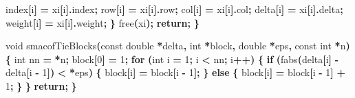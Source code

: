 \documentclass[
  12pt,
]{article}
\newenvironment{Shaded}{\begin{snugshade}}{\end{snugshade}}
\newcommand{\ControlFlowTok}[1]{\textcolor[rgb]{0.13,0.29,0.53}{\textbf{#1}}}
\newcommand{\DataTypeTok}[1]{\textcolor[rgb]{0.13,0.29,0.53}{#1}}
\newcommand{\DecValTok}[1]{\textcolor[rgb]{0.00,0.00,0.81}{#1}}
\newcommand{\NormalTok}[1]{#1}
\newcommand{\OperatorTok}[1]{\textcolor[rgb]{0.81,0.36,0.00}{\textbf{#1}}}
\begin{document}
\begin{Shaded}
\begin{Highlighting}[]
\NormalTok{        index}\OperatorTok{[}\NormalTok{i}\OperatorTok{]} \OperatorTok{=}\NormalTok{ xi}\OperatorTok{[}\NormalTok{i}\OperatorTok{].}\NormalTok{index}\OperatorTok{;}
\NormalTok{        row}\OperatorTok{[}\NormalTok{i}\OperatorTok{]} \OperatorTok{=}\NormalTok{ xi}\OperatorTok{[}\NormalTok{i}\OperatorTok{].}\NormalTok{row}\OperatorTok{;}
\NormalTok{        col}\OperatorTok{[}\NormalTok{i}\OperatorTok{]} \OperatorTok{=}\NormalTok{ xi}\OperatorTok{[}\NormalTok{i}\OperatorTok{].}\NormalTok{col}\OperatorTok{;}
\NormalTok{        delta}\OperatorTok{[}\NormalTok{i}\OperatorTok{]} \OperatorTok{=}\NormalTok{ xi}\OperatorTok{[}\NormalTok{i}\OperatorTok{].}\NormalTok{delta}\OperatorTok{;}
\NormalTok{        weight}\OperatorTok{[}\NormalTok{i}\OperatorTok{]} \OperatorTok{=}\NormalTok{ xi}\OperatorTok{[}\NormalTok{i}\OperatorTok{].}\NormalTok{weight}\OperatorTok{;}
    \OperatorTok{\}}
\NormalTok{    free}\OperatorTok{(}\NormalTok{xi}\OperatorTok{);}
    \ControlFlowTok{return}\OperatorTok{;}
\OperatorTok{\}}

\DataTypeTok{void}\NormalTok{ smacofTieBlocks}\OperatorTok{(}\DataTypeTok{const} \DataTypeTok{double} \OperatorTok{*}\NormalTok{delta}\OperatorTok{,} \DataTypeTok{int} \OperatorTok{*}\NormalTok{block}\OperatorTok{,} \DataTypeTok{double} \OperatorTok{*}\NormalTok{eps}\OperatorTok{,}
                     \DataTypeTok{const} \DataTypeTok{int} \OperatorTok{*}\NormalTok{n}\OperatorTok{)} \OperatorTok{\{}
    \DataTypeTok{int}\NormalTok{ nn }\OperatorTok{=} \OperatorTok{*}\NormalTok{n}\OperatorTok{;}
\NormalTok{    block}\OperatorTok{[}\DecValTok{0}\OperatorTok{]} \OperatorTok{=} \DecValTok{1}\OperatorTok{;}
    \ControlFlowTok{for} \OperatorTok{(}\DataTypeTok{int}\NormalTok{ i }\OperatorTok{=} \DecValTok{1}\OperatorTok{;}\NormalTok{ i }\OperatorTok{\textless{}}\NormalTok{ nn}\OperatorTok{;}\NormalTok{ i}\OperatorTok{++)} \OperatorTok{\{}
        \ControlFlowTok{if} \OperatorTok{(}\NormalTok{fabs}\OperatorTok{(}\NormalTok{delta}\OperatorTok{[}\NormalTok{i}\OperatorTok{]} \OperatorTok{{-}}\NormalTok{ delta}\OperatorTok{[}\NormalTok{i }\OperatorTok{{-}} \DecValTok{1}\OperatorTok{])} \OperatorTok{\textless{}} \OperatorTok{*}\NormalTok{eps}\OperatorTok{)} \OperatorTok{\{}
\NormalTok{            block}\OperatorTok{[}\NormalTok{i}\OperatorTok{]} \OperatorTok{=}\NormalTok{ block}\OperatorTok{[}\NormalTok{i }\OperatorTok{{-}} \DecValTok{1}\OperatorTok{];}
        \OperatorTok{\}} \ControlFlowTok{else} \OperatorTok{\{}
\NormalTok{            block}\OperatorTok{[}\NormalTok{i}\OperatorTok{]} \OperatorTok{=}\NormalTok{ block}\OperatorTok{[}\NormalTok{i }\OperatorTok{{-}} \DecValTok{1}\OperatorTok{]} \OperatorTok{+} \DecValTok{1}\OperatorTok{;}
        \OperatorTok{\}}
    \OperatorTok{\}}
    \ControlFlowTok{return}\OperatorTok{;}
\OperatorTok{\}}


\end{Highlighting}
\end{Shaded}
\end{document}
